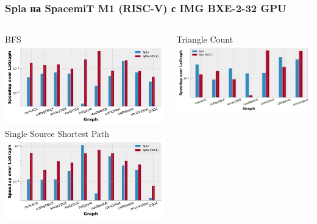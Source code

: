 \documentclass[xcolor=table,aspectratio=169]{beamer}
\begin{document}
\begin{frame}
  \frametitle{\textbf{Spla} на SpacemiT M1 (RISC-V) с IMG BXE-2-32 GPU}

\begin{columns}
        \vspace{-0.5cm}
        \begin{center}
          BFS \\
        \includegraphics[width=0.909\linewidth]{pictures/rq1_rel_bfs.pdf}
        Single Source Shortest Path \\
        \includegraphics[width=0.909\linewidth]{pictures/rq1_rel_sssp.pdf}
        \end{center}
        \vspace{-0.5cm}
        \begin{center}
          Triangle Count\\
        \includegraphics[width=0.9\linewidth]{pictures/rq1_rel_tc.pdf}

\end{center}
\end{columns}
\end{frame}
\end{document}
